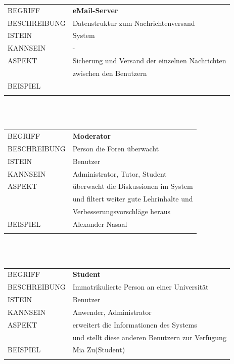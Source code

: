 \documentclass[12pt,a4paper]{article}
\begin{document}
\begin{tabular}{l p{12cm}}
BEGRIFF 	 & \textbf{eMail-Server} \\ 
BESCHREIBUNG & Datenstruktur zum Nachrichtenversand \\
ISTEIN   	 & System \\
KANNSEIN 	 & - \\ 
ASPEKT   	 & Sicherung und Versand der einzelnen Nachrichten\\
			 & zwischen den Benutzern \\
BEISPIEL 	 & \\\\
\hline
\end{tabular}\\\\   

\begin{tabular}{l p{12cm}}
BEGRIFF 	 & \textbf{Moderator} \\ 
BESCHREIBUNG & Person die Foren überwacht\\
ISTEIN   	 & Benutzer \\
KANNSEIN 	 & Administrator, Tutor, Student \\ 
ASPEKT   	 & überwacht die Diskussionen im System \\
 	     	 & und filtert weiter gute Lehrinhalte und\\
 	     	 & Verbesserungsvorschläge heraus\\
BEISPIEL 	 & Alexander Nasaal\\\\
\hline
\end{tabular}\\\\   

\begin{tabular}{l p{12cm}}
BEGRIFF 	 & \textbf{Student} \\ 
BESCHREIBUNG & Immatrikulierte Person an einer Universität \\ 
ISTEIN   	 & Benutzer \\
KANNSEIN 	 & Anwender, Administrator \\ 
ASPEKT   	 & erweitert die Informationen des Systems\\
 	     	 & und stellt diese anderen Benutzern zur Verfügung \\
BEISPIEL 	 & Mia Zu(Student)\\\\
\hline
\end{tabular}\\\\  
\end{document}
